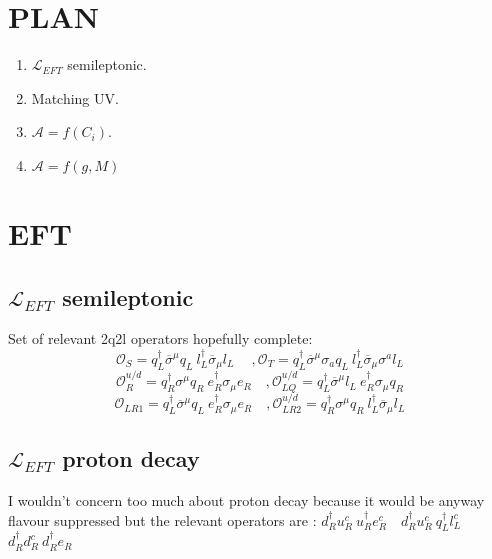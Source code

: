 \documentclass{article}
\begin{document}
\section{PLAN}
\begin{enumerate}
\item $\mathcal{L}_{EFT}$ semileptonic.
\item Matching UV.
\item $\mathcal{A}=f(C_i)$.
\item $\mathcal{A}=f(g,M)$
\end{enumerate}
\section{EFT}
\subsection{$\mathcal{L}_{EFT}$ semileptonic}
Set of relevant 2q2l operators hopefully complete:
\[ %
\mathcal{O}_S= q_L^\dagger \overline{\sigma}^\mu q_L \ l_L^\dagger \overline{\sigma}_\mu l_L \  \quad,\mathcal{O}_T=q_L^\dagger \overline{\sigma}^\mu  \sigma_a q_L \ l_L^\dagger \overline{\sigma}_\mu \sigma^a l_L
\]
\[ %
\mathcal{O}^{u/d}_R = q_R^\dagger \sigma^\mu q_R \ e_R^\dagger \sigma_\mu e_R \quad, \mathcal{O}_{LQ}^{u/d}= q_L^\dagger \overline{\sigma}^\mu l_L \ e_R^\dagger \sigma_\mu q_R
\]
\[ %
\mathcal{O}_{LR1}= q_L^\dagger \overline{\sigma}^\mu q_L \ e_R^\dagger \sigma_\mu e_R \quad, \mathcal{O}_{LR2}^{u/d}= q_R^\dagger \sigma^\mu q_R \ l_L^\dagger \overline{\sigma}_\mu l_L 
\]

\subsection{$\mathcal{L}_{EFT}$ proton decay}
I wouldn't concern too much about proton decay because it would be anyway flavour suppressed but the relevant operators are : $ d_R^\dagger u_R^c \ u_R^\dagger e_R^c \quad  d_R^\dagger u_R^c \ q_L^\dagger l_L^c $ $ d_R^\dagger d_R^c \ d_R^\dagger e_R $
\end{document}
